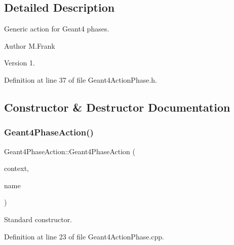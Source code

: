 \subsection{Detailed Description}
Generic action for Geant4 phases. 

\begin{DoxyAuthor}{Author}
M.\+Frank 
\end{DoxyAuthor}
\begin{DoxyVersion}{Version}
1. 
\end{DoxyVersion}


Definition at line 37 of file Geant4\+Action\+Phase.\+h.



\subsection{Constructor \& Destructor Documentation}
\hypertarget{class_d_d4hep_1_1_simulation_1_1_geant4_phase_action_ad15d56cd51ec30099dea4db3ab92ae52}{}\label{class_d_d4hep_1_1_simulation_1_1_geant4_phase_action_ad15d56cd51ec30099dea4db3ab92ae52} 
\subsubsection{\texorpdfstring{Geant4\+Phase\+Action()}{Geant4PhaseAction()}}
{\footnotesize\ttfamily Geant4\+Phase\+Action\+::\+Geant4\+Phase\+Action (\begin{DoxyParamCaption}\item[{\hyperlink{class_d_d4hep_1_1_simulation_1_1_geant4_context}{Geant4\+Context} $\ast$}]{context,  }\item[{const std\+::string \&}]{name }\end{DoxyParamCaption})}



Standard constructor. 



Definition at line 23 of file Geant4\+Action\+Phase.\+cpp.

\hypertarget{class_d_d4hep_1_1_simulation_1_1_geant4_phase_action_aba4b3737a47e5f9aa71ee76c1292bfdd}{}\label{class_d_d4hep_1_1_simulation_1_1_geant4_phase_action_aba4b3737a47e5f9aa71ee76c1292bfdd} 
